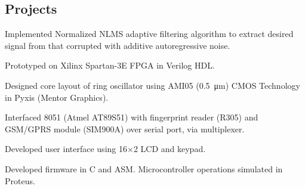 \documentclass[]{deedy}
\begin{document}
\begin{minipage}[t]{0.69\textwidth}
\begin{flushleft}
%
\section{Projects}
%
\vspace{1.1pt}
\begin{tightemize}
\item Implemented Normalized NLMS adaptive filtering algorithm to extract desired signal from that corrupted with additive autoregressive noise.
\item Prototyped on Xilinx Spartan-3E FPGA in Verilog HDL.
\end{tightemize}
\sectionsep
%
\vspace{1.1pt}
\begin{tightemize}
\item Designed core layout of ring oscillator using AMI05 (\SI{0.5}{\micro\metre}) CMOS Technology in Pyxis (Mentor Graphics).
\end{tightemize}
\sectionsep
%
\vspace{1.1pt}
\begin{tightemize}
\item Interfaced 8051 (Atmel AT89S51) with fingerprint reader (R305) and GSM/GPRS module (SIM900A) over serial port, via multiplexer.
\item Developed user interface using 16$\times$2 LCD and keypad.
\item Developed firmware in C and ASM. Microcontroller operations simulated in Proteus.
\end{tightemize}
\sectionsep

\end{flushleft}
\end{minipage}
\end{document}
